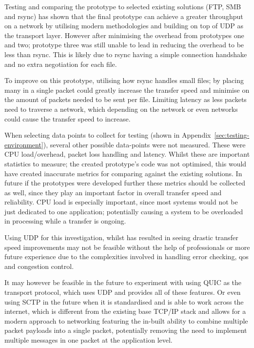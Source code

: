 Testing and comparing the prototype to selected existing solutions (FTP, SMB and rsync) has shown that the final prototype can achieve a greater throughput on a network by utilising modern methodologies and building on top of UDP as the transport layer. However after minimising the overhead from prototypes one and two; prototype three was still unable to lead in reducing the overhead to be less than rsync. This is likely due to rsync having a simple connection handshake and no extra negotiation for each file.

To improve on this prototype, utilising how rsync handles small files; by placing many in a single packet could greatly increase the transfer speed and minimise on the amount of packets needed to be sent per file. Limiting latency as less packets need to traverse a network, which depending on the network or even networks could cause the transfer speed to increase.

When selecting data points to collect for testing (shown in Appendix~\ref{sec:testing-environment}), several other possible data-points were not measured. These were CPU load/overhead, packet loss handling and latency. Whilst these are important statistics to measure; the created prototype's code was not optimised, this would have created inaccurate metrics for comparing against the existing solutions. In future if the prototypes were developed further these metrics should be collected as well, since they play an important factor in overall transfer speed and reliability. CPU load is especially important, since most systems would not be just dedicated to one application; potentially causing a system to be overloaded in processing while a transfer is ongoing.

Using UDP for this investigation, whilst has resulted in seeing drastic transfer speed improvements may not be feasible without the help of professionals or more future experience due to the complexities involved in handling error checking, \acrfull{qos} and congestion control.

It may however be feasible in the future to experiment with using QUIC as the transport protocol, which uses UDP and provides all of these features. Or even using SCTP in the future when it is standardised and is able to work across the internet, which is different from the existing base TCP/IP stack and allows for a modern approach to networking featuring the in-built ability to combine multiple packet payloads into a single packet, potentially removing the need to implement multiple messages in one packet at the application level.

